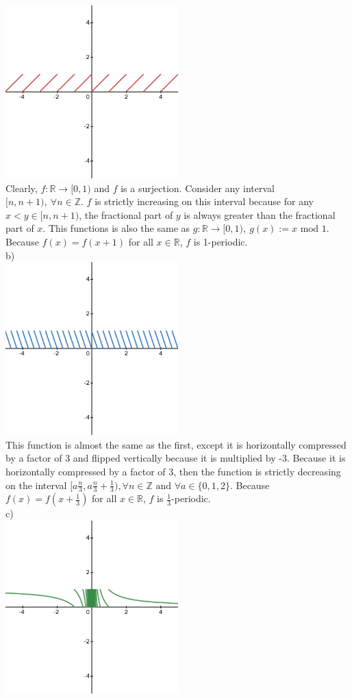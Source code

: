 \documentclass[11pt]{article}
\newcommand{\R}{\mathbb{R}}
\newcommand{\Z}{\mathbb{Z}}
\begin{document}
\begin{flushleft}
\includegraphics[width=0.5\textwidth]{fractionalfunction1.png} \\
Clearly, $f:\R \rightarrow [0,1)$ and $f$ is a surjection. Consider any interval $[n,n+1), \ \forall n \in \Z$. $f$ is strictly increasing on this interval because for any $x<y \in [n,n+1)$, the fractional part of $y$ is always greater than the fractional part of $x$. This functions is also the same as $g: \R \rightarrow [0,1), \ g(x):= x \text{ mod 1}$. Because $f(x) = f(x+1)$ for all $x \in \R$, $f$ is 1-periodic. \\
\bigskip
b) \\
\includegraphics[width=0.5\textwidth]{fractionalfunction2.png} \\
This function is almost the same as the first, except it is horizontally compressed by a factor of 3 and flipped vertically because it is multiplied by -3. Because it is horizontally compressed by a factor of 3, then the function is strictly decreasing on the interval $[a\frac{n}{3}, a\frac{n}{3} + \frac{1}{3}), \forall n \in \Z \text{ and } \forall a \in \{ 0, 1, 2 \}$. Because $f(x) = f(x+\frac{1}{3})$ for all $x \in \R$, $f$ is $\frac{1}{3}$-periodic. \\
\bigskip
c) \\
\includegraphics[width=0.5\textwidth]{fractionalfunction3.png} \\

\end{flushleft}
\end{document}
